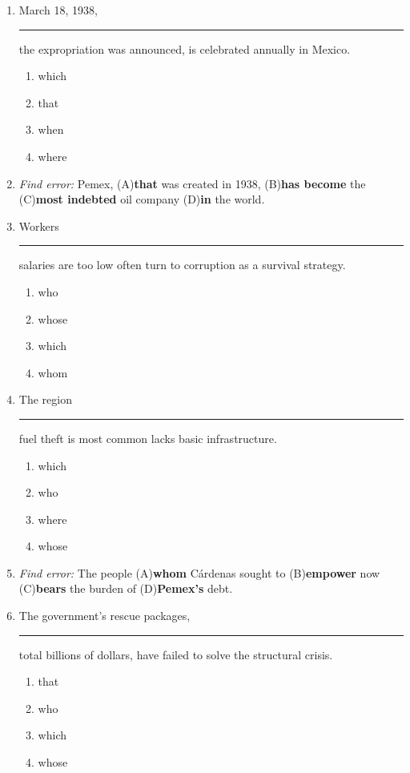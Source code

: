 \documentclass[10pt,a4paper]{article}
\begin{document}
\begin{enumerate}[label=\textbf{\arabic*.}, leftmargin=*]
\item March 18, 1938, \rule{2cm}{0.4pt} the expropriation was
announced, is celebrated annually in Mexico.
\begin{enumerate}[label=(\Alph*)]
\item which \item that \item when \item where
\end{enumerate}

\item \textit{Find error:}
Pemex, (A)\textbf{that} was created in 1938, (B)\textbf{has become}
the (C)\textbf{most indebted} oil company (D)\textbf{in} the world.

\item Workers \rule{2cm}{0.4pt} salaries are too low often turn to
corruption as a survival strategy.
\begin{enumerate}[label=(\Alph*)]
\item who \item whose \item which \item whom
\end{enumerate}

\item The region \rule{2cm}{0.4pt} fuel theft is most common lacks
basic infrastructure.
\begin{enumerate}[label=(\Alph*)]
\item which \item who \item where \item whose
\end{enumerate}

\item \textit{Find error:}
The people (A)\textbf{whom} C\'ardenas sought to (B)\textbf{empower}
now (C)\textbf{bears} the burden of (D)\textbf{Pemex's} debt.

\item The government's rescue packages, \rule{2cm}{0.4pt} total
billions of dollars, have failed to solve the structural crisis.
\begin{enumerate}[label=(\Alph*)]
\item that \item who \item which \item whose
\end{enumerate}
\end{enumerate}
\end{document}
